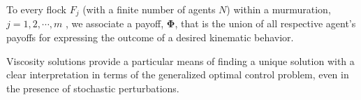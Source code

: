 
\begin{definition}
	To every flock $F_j$ (with a finite number of agents $N$) within a murmuration, $j = 1, 2, \cdots, m$ , we associate a payoff, $\bm{\Phi}$, that is the union of all respective agent's payoffs for expressing the outcome of a desired kinematic behavior. %
	\label{def:payoff}
\end{definition}
%
%
%
%
Viscosity solutions provide a particular means of finding a unique solution with a clear interpretation in terms of the generalized optimal control problem, even in the presence of stochastic perturbations. 
%
